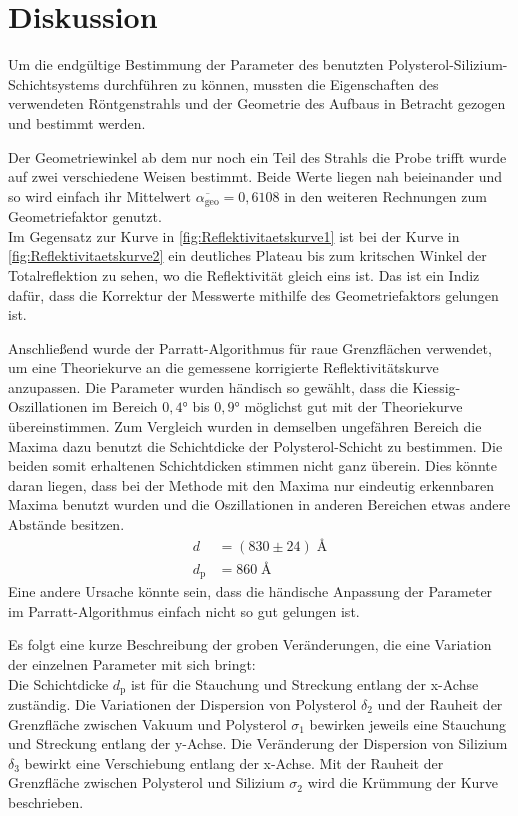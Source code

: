 \newpage
\section{Diskussion}
\label{sec:diskussion}
    Um die endgültige Bestimmung der Parameter des benutzten Polysterol-Silizium-Schichtsystems durchführen zu können, mussten die Eigenschaften des verwendeten Röntgenstrahls und der Geometrie des Aufbaus in Betracht gezogen und bestimmt werden.

    Der Geometriewinkel ab dem nur noch ein Teil des Strahls die Probe trifft wurde auf zwei verschiedene Weisen bestimmt.
    Beide Werte liegen nah beieinander und so wird einfach ihr Mittelwert $\overline{\alpha_{\mathrm{geo}}} = 0,6108$ in den weiteren Rechnungen zum Geometriefaktor genutzt. \\
    Im Gegensatz zur Kurve in \autoref{fig:Reflektivitaetskurve1} ist bei der Kurve in \autoref{fig:Reflektivitaetskurve2} ein deutliches Plateau bis zum kritschen Winkel der Totalreflektion zu sehen, wo die Reflektivität gleich eins ist. Das ist ein Indiz dafür, dass die Korrektur der Messwerte mithilfe des Geometriefaktors gelungen ist.

    Anschließend wurde der Parratt-Algorithmus für raue Grenzflächen verwendet, um eine Theoriekurve an die gemessene korrigierte Reflektivitätskurve anzupassen.
    Die Parameter wurden händisch so gewählt, dass die Kiessig-Oszillationen im Bereich $0,4°$ bis $0,9°$ möglichst gut mit der Theoriekurve übereinstimmen.
    Zum Vergleich wurden in demselben ungefähren Bereich die Maxima dazu benutzt die Schichtdicke der Polysterol-Schicht zu bestimmen.
    Die beiden somit erhaltenen Schichtdicken stimmen nicht ganz überein.
    Dies könnte daran liegen, dass bei der Methode mit den Maxima nur eindeutig erkennbaren Maxima benutzt wurden und die Oszillationen in anderen Bereichen etwas andere Abstände besitzen.
    \begin{align*}
        d &= (830 \pm 24) \; \text{\AA} \\
        d_{\mathrm{p}} &= 860 \; \text{\AA}
    \end{align*}
    Eine andere Ursache könnte sein, dass die händische Anpassung der Parameter im Parratt-Algorithmus einfach nicht so gut gelungen ist.
    
    Es folgt eine kurze Beschreibung der groben Veränderungen, die eine Variation der einzelnen Parameter mit sich bringt: \\
    Die Schichtdicke $d_{\mathrm{p}}$ ist für die Stauchung und Streckung entlang der x-Achse zuständig.
    Die Variationen der Dispersion von Polysterol $\delta_2$ und der Rauheit der Grenzfläche zwischen Vakuum und Polysterol $\sigma_1$ bewirken jeweils eine Stauchung und Streckung entlang der y-Achse.
    Die Veränderung der Dispersion von Silizium $\delta_3$ bewirkt eine Verschiebung entlang der x-Achse.
    Mit der Rauheit der Grenzfläche zwischen Polysterol und Silizium $\sigma_2$ wird die Krümmung der Kurve beschrieben.


